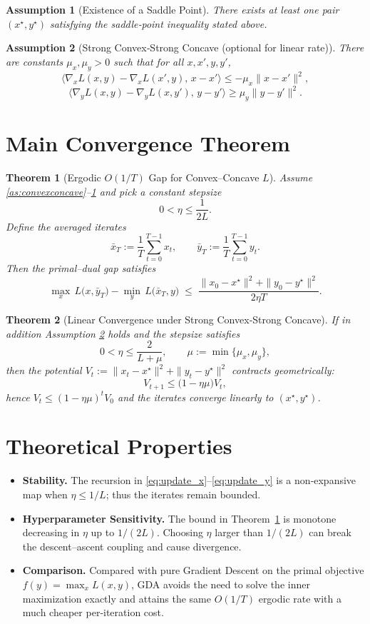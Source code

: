 \documentclass{article}
\newtheorem{theorem}{Theorem}
\newtheorem{assumption}{Assumption}
\newcommand{\grad}{\nabla}
\begin{document}
\begin{assumption}[Existence of a Saddle Point]\label{as:saddle}
There exists at least one pair $(x^{\star},y^{\star})$ satisfying the saddle‑point inequality stated above.
\end{assumption}

\begin{assumption}[Strong Convex‑Strong Concave (optional for linear rate)]\label{as:strong}
There are constants $\mu_{x},\mu_{y}>0$ such that for all $x,x',y,y'$,
\[
\langle \grad_{x}L(x,y)-\grad_{x}L(x',y),\,x-x'\rangle\le -\mu_{x}\|x-x'\|^{2},
\]
\[
\langle \grad_{y}L(x,y)-\grad_{y}L(x,y'),\,y-y'\rangle\ge \mu_{y}\|y-y'\|^{2}.
\]
\end{assumption}

\section*{Main Convergence Theorem}
\begin{theorem}[Ergodic $O(1/T)$ Gap for Convex–Concave $L$]\label{thm:ergodic}
Assume \ref{as:convexconcave}–\ref{as:saddle} and pick a constant stepsize 
\[
0<\eta\le\frac{1}{2L}.
\]
Define the averaged iterates
\[
\bar{x}_{T}:=\frac{1}{T}\sum_{t=0}^{T-1}x_{t},\qquad 
\bar{y}_{T}:=\frac{1}{T}\sum_{t=0}^{T-1}y_{t}.
\]
Then the primal–dual gap satisfies
\[
\max_{x}\,L\bigl(x,\bar{y}_{T}\bigr)-\min_{y}\,L\bigl(\bar{x}_{T},y\bigr)
\;\le\;
\frac{\|x_{0}-x^{\star}\|^{2}+\|y_{0}-y^{\star}\|^{2}}{2\eta T}.
\]
\end{theorem}

\begin{theorem}[Linear Convergence under Strong Convex‑Strong Concave]\label{thm:linear}
If in addition Assumption \ref{as:strong} holds and the stepsize satisfies
\[
0<\eta\le \frac{2}{L+\mu},\qquad\mu:=\min\{\mu_{x},\mu_{y}\},
\]
then the potential $V_{t}:=\|x_{t}-x^{\star}\|^{2}+\|y_{t}-y^{\star}\|^{2}$ contracts geometrically:
\[
V_{t+1}\le\bigl(1-\eta\mu\bigr)V_{t},
\]
hence $V_{t}\le (1-\eta\mu)^{t}V_{0}$ and the iterates converge linearly to $(x^{\star},y^{\star})$.
\end{theorem}

\section*{Theoretical Properties}
\begin{itemize}
    \item \textbf{Stability.} The recursion in \eqref{eq:update_x}–\eqref{eq:update_y} is a non‑expansive map when $\eta\le 1/L$; thus the iterates remain bounded.
    \item \textbf{Hyperparameter Sensitivity.} The bound in Theorem~\ref{thm:ergodic} is monotone decreasing in $\eta$ up to $1/(2L)$. Choosing $\eta$ larger than $1/(2L)$ can break the descent–ascent coupling and cause divergence.
    \item \textbf{Comparison.} Compared with pure Gradient Descent on the primal objective $f(y)=\max_{x}L(x,y)$, GDA avoids the need to solve the inner maximization exactly and attains the same $O(1/T)$ ergodic rate with a much cheaper per‑iteration cost.
\end{itemize}
\end{document}
